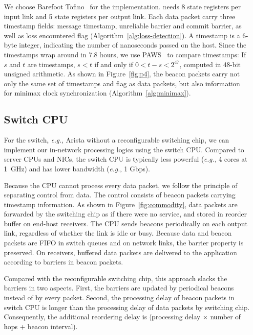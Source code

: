 We choose Barefoot Tofino~\cite{tofino} for the implementation. \sys needs 8 state registers per input link and 5 state registers per output link. Each data packet carry three timestamp fields: message timestamp, unreliable barrier and commit barrier, as well as loss encountered flag (Algorithm~\ref{alg:loss-detection}).
A timestamp is a 6-byte integer, indicating the number of nanoseconds passed on the host. Since the timestamps wrap around in 7.8 hours, we use PAWS~\cite{jacobson1992tcp} to compare timestamps: If $s$ and $t$ are timestamps, $s < t$ if and only if $0 < t - s < 2^{47}$, computed in 48-bit unsigned arithmetic. As shown in Figure~\ref{fig:p4}, the beacon packets carry not only the same set of timestamps and flag as data packets, but also information for minimax clock synchronization (Algorithm~\ref{alg:minimax}).

\subsection{Switch CPU}
\label{sec:commodity}

For the switch, \textit{e.g.,} Arista  without a reconfigurable switching chip, we can implement our in-network processing logics using the switch CPU. 
Compared to server CPUs and NICs, the switch CPU is typically less powerful (\textit{e.g.}, 4 cores at 1~GHz) and has lower bandwidth (\textit{e.g.}, 1 Gbps).

Because the CPU cannot process every data packet, we follow the principle of separating control from data.
The control consists of beacon packets carrying timestamp information. As shown in Figure~\ref{fig:commodity}, data packets are forwarded by the switching chip as if there were no \sys service, and stored in reorder buffer on end-host receivers.
The CPU sends beacons periodically on each output link, regardless of whether the link is idle or busy.
Because data and beacon packets are FIFO in switch queues and on network links, the barrier property is preserved. On receivers, buffered data packets are delivered to the application according to barriers in beacon packets.

Compared with the reconfigurable switching chip, this approach slacks the barriers in two aspects.
First, the barriers are updated by periodical beacons instead of by every packet.
Second, the processing delay of beacon packets in switch CPU is longer than the processing delay of data packets by switching chip.
Consequently, the additional reordering delay is (processing delay $\times$ number of hops + beacon interval).

